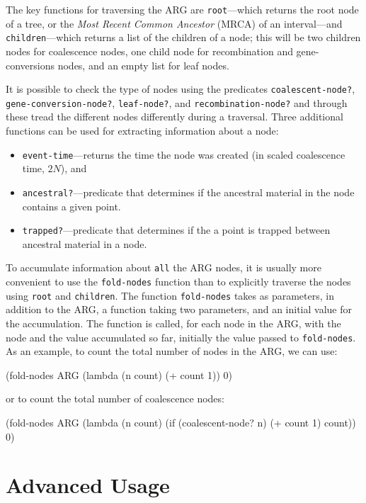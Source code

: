\documentclass{manual}
\begin{document}
\begin{empfile}
The key functions for traversing the ARG are \texttt{root}---which
returns the root node of a tree, or the \emph{Most Recent Common
  Ancestor} (MRCA) of an interval---and \texttt{children}---which
returns a list of the children of a node; this will be two children
nodes for coalescence nodes, one child node for recombination and
gene-conversions nodes, and an empty list for leaf nodes.

It is possible to check the type of nodes using the predicates
\texttt{coalescent-node?}, \texttt{gene-conversion-node?},
\texttt{leaf-node?}, and \texttt{recombination-node?} and through
these tread the different nodes differently during a traversal.  Three
additional functions can be used for extracting information about a
node:
\begin{itemize}
\item \texttt{event-time}---returns the time the node was created (in
  scaled coalescence time, $2N$), and
\item \texttt{ancestral?}---predicate that determines if the
  ancestral material in the node contains a given point.
\item \texttt{trapped?}---predicate that determines if the
  a point is trapped between ancestral material in a node.
\end{itemize}

To accumulate information about \texttt{all} the ARG nodes, it is
usually more convenient to use the \texttt{fold-nodes} function than
to explicitly traverse the nodes using \texttt{root} and
\texttt{children}.  The function \texttt{fold-nodes} takes as
parameters, in addition to the ARG, a function taking two parameters,
and an initial value for the accumulation.  The function is called,
for each node in the ARG, with the node and the value accumulated so
far, initially the value passed to \texttt{fold-nodes}.  As an
example, to count the total number of nodes in the ARG, we can use:
\begin{code}
(fold-nodes ARG (lambda (n count) (+ count 1)) 0)
\end{code}
or to count the total number of coalescence nodes:
\begin{code}
(fold-nodes ARG 
            (lambda (n count) 
               (if (coalescent-node? n) (+ count 1) count)) 
            0)
\end{code}





\section{Advanced Usage}
\label{sec:advanced-usage}


\end{empfile}
\end{document}
